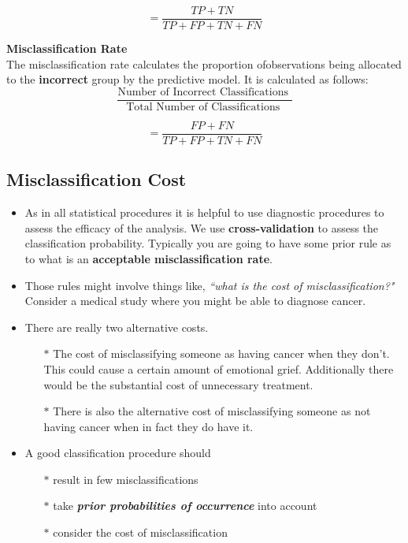 \documentclass[]{report}
\begin{document}
\[ = \frac{TP + TN}{TP+FP+TN+FN}\]

\medskip

\noindent \textbf{Misclassification Rate}\\
The misclassification rate calculates the proportion ofobservations being allocated to the \textbf{incorrect} group by the predictive model. It is calculated as follows:
\[ \frac{
\mbox{Number of Incorrect Classifications }}{\mbox{Total Number of Classifications }} \]

\[ = \frac{FP + FN}{TP+FP+TN+FN}\]
\newpage

\subsection{Misclassification Cost}
\begin{itemize}
	\item As in all statistical procedures it is helpful to use diagnostic procedures to assess the efficacy of the analysis. We use \textbf{cross-validation} to assess the classification probability.
	Typically you are going to have some prior rule as to what is an \textbf{acceptable misclassification rate}.
	
	\item	Those rules might involve things like, \textit{``what is the cost of misclassification?"} Consider a medical study where you might be able to diagnose cancer.
	
	\item There are really two alternative costs. 
	\begin{itemize}
		\item[$\ast$] The cost of misclassifying someone as having cancer when they don't.
	This could cause a certain amount of emotional grief. Additionally there would be the substantial cost of unnecessary treatment.
	
	\item[$\ast$] There is also the alternative cost of misclassifying someone as not having cancer when in fact they do have it.
	\end{itemize}
	\item A good classification procedure should
	\begin{itemize}
		\item[$\ast$] result in few misclassifications
		\item[$\ast$] take \textbf{\textit{prior probabilities of occurrence}} into account
		\item[$\ast$] consider the cost of misclassification
	\end{itemize}
	

\end{itemize}
\end{document}
